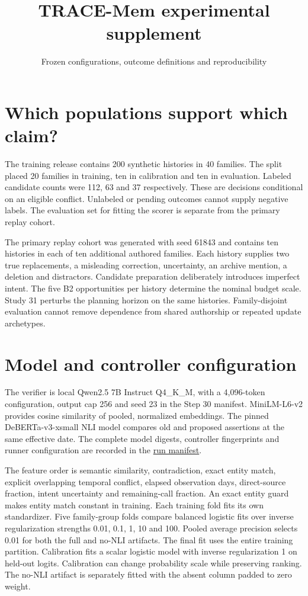 \documentclass[
  11pt,
]{article}
\title{TRACE-Mem experimental supplement}
\subtitle{Frozen configurations, outcome definitions and
reproducibility}
\author{}
\date{}
\begin{document}
\maketitle

\section{Which populations support which
claim?}\label{which-populations-support-which-claim}

The training release contains 200 synthetic histories in 40 families.
The split placed 20 families in training, ten in calibration and ten in
evaluation. Labeled candidate counts were 112, 63 and 37 respectively.
These are decisions conditional on an eligible conflict. Unlabeled or
pending outcomes cannot supply negative labels. The evaluation set for
fitting the scorer is separate from the primary replay cohort.

The primary replay cohort was generated with seed 61843 and contains ten
histories in each of ten additional authored families. Each history
supplies two true replacements, a misleading correction, uncertainty, an
archive mention, a deletion and distractors. Candidate preparation
deliberately introduces imperfect intent. The five B2 opportunities per
history determine the nominal budget scale. Study 31 perturbs the
planning horizon on the same histories. Family-disjoint evaluation
cannot remove dependence from shared authorship or repeated update
archetypes.

\section{Model and controller
configuration}\label{model-and-controller-configuration}

The verifier is local Qwen2.5 7B Instruct Q4\_K\_M, with a 4,096-token
configuration, output cap 256 and seed 23 in the Step 30 manifest.
MiniLM-L6-v2 provides cosine similarity of pooled, normalized
embeddings. The pinned DeBERTa-v3-xsmall NLI model compares old and
proposed assertions at the same effective date. The complete model
digests, controller fingerprints and runner configuration are recorded
in the \href{../../docs/step30_artifacts/run-manifest.json}{run
manifest}.

The feature order is semantic similarity, contradiction, exact entity
match, explicit overlapping temporal conflict, elapsed observation days,
direct-source fraction, intent uncertainty and remaining-call fraction.
An exact entity guard makes entity match constant in training. Each
training fold fits its own standardizer. Five family-group folds compare
balanced logistic fits over inverse regularization strengths 0.01, 0.1,
1, 10 and 100. Pooled average precision selects 0.01 for both the full
and no-NLI artifacts. The final fit uses the entire training partition.
Calibration fits a scalar logistic model with inverse regularization 1
on held-out logits. Calibration can change probability scale while
preserving ranking. The no-NLI artifact is separately fitted with the
absent column padded to zero weight.
\end{document}
